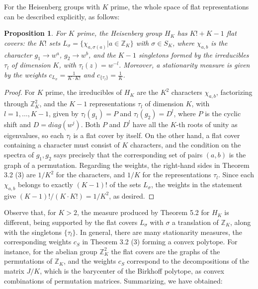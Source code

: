 \documentclass[12pt]{amsart}
\newtheorem{proposition}[theorem]{Proposition}
\theoremstyle{definition}
\begin{document}
For the Heisenberg groups with $K$ prime, the whole space of flat representations can be described explicitly, as follows:

\begin{proposition}
For $K$ prime, the Heisenberg group $H_K$ has $K!+K-1$ flat covers: the $K!$ sets $L_\sigma=\{\chi_{a,\sigma(a)}|a\in\mathbb Z_K\}$ with $\sigma\in S_K$, where $\chi_{a,b}$ is the character $g_1\to w^a$, $g_2\to w^b$, and the $K-1$ singletons formed by the irreducibles $\tau_l$ of dimension $K$, with $\tau_l(z)=w^{-l}$. Moreover, a stationarity measure is given by the weights $c_{L_\sigma}=\frac{1}{K\cdot K!}$ and $c_{\{\tau_l\}}=\frac{1}{K}$.
\end{proposition}

\begin{proof}
For $K$ prime, the irreducibles of $H_K$ are the $K^2$ characters $\chi_{a,b}$, factorizing through $\mathbb Z_K^2$, and the $K-1$ representations $\tau_l$ of dimension $K$, with $l=1,\ldots,K-1$, given by $\tau_l(g_1)=P$ and $\tau_l(g_2)=D^l$, where $P$ is the cyclic shift and $D=diag(w^j)$. Both $P$ and $D^l$ have all the $K$-th roots of unity as eigenvalues, so each $\tau_l$ is a flat cover by itself. On the other hand, a flat cover containing a character must consist of $K$ characters, and the condition on the spectra of $g_1,g_2$ says precisely that the corresponding set of pairs $(a,b)$ is the graph of a permutation. Regarding the weights, the right-hand sides in Theorem 3.2 (3) are $1/K^2$ for the characters, and $1/K$ for the representations $\tau_l$. Since each $\chi_{a,b}$ belongs to exactly $(K-1)!$ of the sets $L_\sigma$, the weights in the statement give $(K-1)!/(K\cdot K!)=1/K^2$, as desired.
\end{proof}

Observe that, for $K>2$, the measure produced by Theorem 5.2 for $H_K$ is different, being supported by the flat covers $L_\sigma$ with $\sigma$ a translation of $\mathbb Z_K$, along with the singletons $\{\tau_l\}$. In general, there are many stationarity measures, the corresponding weights $c_S$ in Theorem 3.2 (3) forming a convex polytope. For instance, for the abelian group $\mathbb Z_K^2$ the flat covers are the graphs of the permutations of $\mathbb Z_K$, and the weights $c_S$ correspond to the decompositions of the matrix $J/K$, which is the barycenter of the Birkhoff polytope, as convex combinations of permutation matrices. Summarizing, we have obtained:
\end{document}
